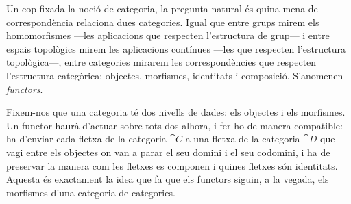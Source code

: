 Un cop fixada la noció de categoria, la pregunta natural és quina mena de correspondència relaciona dues categories. Igual que entre grups mirem els homomorfismes ---les aplicacions que respecten l'estructura de grup--- i entre espais topològics mirem les aplicacions contínues ---les que respecten l'estructura topològica---, entre categories mirarem les correspondències que respecten l'estructura categòrica: objectes, morfismes, identitats i composició. S'anomenen \emph{functors}.

Fixem-nos que una categoria té dos nivells de dades: els objectes i els morfismes. Un functor haurà d'actuar sobre tots dos alhora, i fer-ho de manera compatible: ha d'enviar cada fletxa de la categoria $\cat{C}$ a una fletxa de la categoria $\cat{D}$ que vagi entre els objectes on van a parar el seu domini i el seu codomini, i ha de preservar la manera com les fletxes es componen i quines fletxes són identitats. Aquesta és exactament la idea que fa que els functors siguin, a la vegada, els morfismes d'una categoria de categories.


